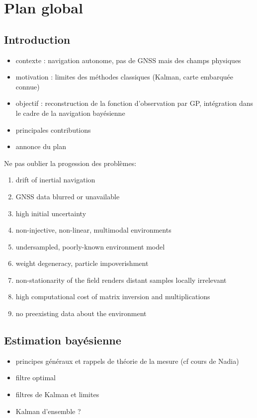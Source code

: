 \chapter{Plan global}

\vfill
\localtableofcontents
\vfill
\newpage

\section{Introduction}

\begin{itemize}
	\item contexte : navigation autonome, pas de GNSS mais des champs physiques
	\item motivation : limites des méthodes classiques (Kalman, carte embarquée connue)
	\item objectif : reconstruction de la fonction d'observation par GP, intégration dans le cadre de la navigation bayésienne
	\item principales contributions
	\item annonce du plan
\end{itemize}

Ne pas oublier la progession des problèmes:
\begin{enumerate}
	\item drift of inertial navigation
	\item GNSS data blurred or unavailable
	\item high initial uncertainty
	\item non-injective, non-linear, multimodal environments
	\item undersampled, poorly-known environment model
	\item weight degeneracy, particle impoverishment
	\item non-stationarity of the field renders distant samples locally irrelevant
	\item high computational cost of matrix inversion and multiplications
	\item no preexisting data about the environment
\end{enumerate}

\section{Estimation bayésienne}

\begin{itemize}
	\item principes généraux et rappels de théorie de la mesure (cf cours de Nadia)
	\item filtre optimal
	\item filtres de Kalman et limites
	\item Kalman d'ensemble ?
\end{itemize}

